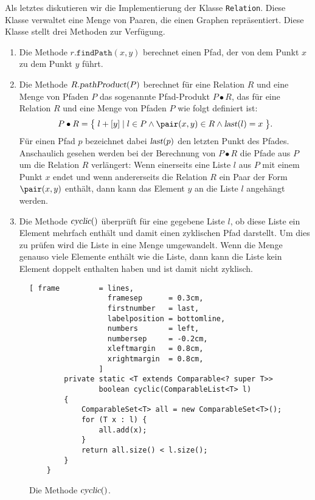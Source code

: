 \noindent
Als letztes diskutieren wir die Implementierung der Klasse \texttt{Relation}.
Diese Klasse verwaltet eine Menge von Paaren, die einen Graphen repr\"asentiert.
Diese Klasse stellt drei Methoden zur Verf\"ugung.
\begin{enumerate}
\item Die Methode $r.\mathtt{findPath}(x,y)$ berechnet einen Pfad, der von dem Punkt $x$
      zu dem Punkt $y$ f\"uhrt.
\item Die Methode $R.\textsl{pathProduct}(P)$ berechnet f\"ur eine Relation $R$ und
      eine Menge von Pfaden $P$ das sogenannte Pfad-Produkt $P \bullet R$, das f\"ur eine Relation $R$
      und eine Menge von Pfaden $P$ wie folgt definiert ist:
      \[ 
         P \bullet R = \bigl\{\; l + [y] \mid 
         l \in P \wedge \pair(x,y) \in R \wedge \textsl{last}(l) = x \;\bigr\}.
      \]
      F\"ur einen Pfad $p$ bezeichnet dabei $\textsl{last}(p)$ den letzten Punkt des
      Pfades.  Anschaulich gesehen werden bei der Berechnung von $P \bullet R$
      die Pfade aus $P$ um die Relation $R$ verl\"angert:  Wenn einerseits eine Liste $l$ aus
      $P$ mit einem Punkt $x$ endet und wenn andererseits die Relation $R$
      ein Paar der Form $\pair(x, y)$ enth\"alt, dann kann das Element $y$ an die Liste $l$
      angeh\"angt werden.
\item Die Methode $\textsl{cyclic}()$ \"uberpr\"uft f\"ur eine gegebene Liste $l$, ob diese
      Liste ein Element mehrfach enth\"alt und damit einen zyklischen Pfad darstellt.
      Um dies zu pr\"ufen wird die Liste in eine Menge umgewandelt.  Wenn die Menge genauso
      viele Elemente enth\"alt wie die Liste, dann kann die Liste kein Element doppelt
      enthalten haben und ist damit nicht zyklisch.
\end{enumerate}

\begin{figure}[!h]
\centering
\begin{Verbatim}[ frame         = lines, 
                  framesep      = 0.3cm, 
                  firstnumber   = last,
                  labelposition = bottomline,
                  numbers       = left,
                  numbersep     = -0.2cm,
                  xleftmargin   = 0.8cm,
                  xrightmargin  = 0.8cm,
                ]
        private static <T extends Comparable<? super T>>
                boolean cyclic(ComparableList<T> l) 
        {
            ComparableSet<T> all = new ComparableSet<T>();
            for (T x : l) {
                all.add(x);
            }
            return all.size() < l.size();
        }        
    }
\end{Verbatim}
\vspace*{-0.3cm}
\caption{Die Methode $\textsl{cyclic}()$.}
\label{fig:cyclic.java}
\end{figure}
      
\vspace*{\fill}


